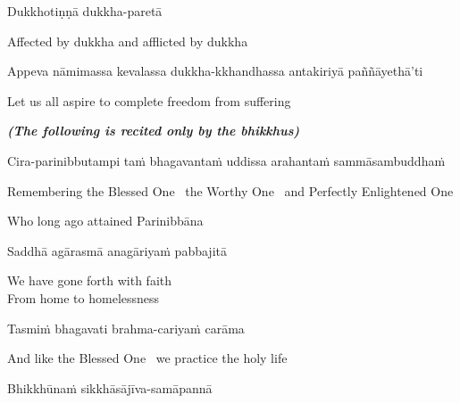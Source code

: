 Dukkhotiṇṇā dukkha-paretā

\begin{english}
    Affected by dukkha and afflicted by dukkha\makeatletter\hyperlink{endnote27-appendix}\makeatother
\end{english}

\begin{pali-hang}
  Appeva nāmimassa kevalassa dukkha-kkhandhassa antakiriyā paññāyethā'ti
\end{pali-hang}

\begin{english}
  Let us all aspire to complete freedom from suffering
\end{english}

\clearpage

\begin{center}
  \textit{\textbf{(The following is recited only by the bhikkhus)}}
\end{center}

\begin{pali-hang}
  Cira-parinibbutampi taṁ bhagavantaṁ uddissa arahantaṁ sammāsambuddhaṁ
\end{pali-hang}

\begin{english-hang}
  Remembering the Blessed One \breathmark\ the Worthy One \breathmark\ and Perfectly Enlightened One\\
\end{english-hang}

\begin{english}
  Who long ago attained Parinibbāna
\end{english}

Saddhā agārasmā anagāriyaṁ pabbajitā

\begin{english}
  We have gone forth with faith\\
  From home to homelessness
\end{english}

Tasmiṁ bhagavati brahma-cariyaṁ carāma

\begin{english}
  And like the Blessed One \breathmark\ we practice the holy life
\end{english}

Bhikkhūnaṁ sikkhāsājīva-samāpannā

